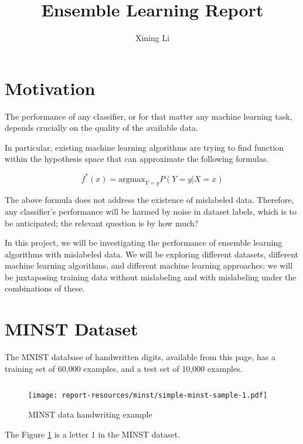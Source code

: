 \documentclass{article}
\author{Xining Li}
\title {Ensemble Learning Report}
\begin{document}
\maketitle

\section{Motivation}

The performance of any classifier, or for that matter any machine learning task, depends crucially on the quality of the available data. 


In particular, existing machine learning algorithms are trying to find function within the hypothesis space that can approximate the following formulas. 

\begin{equation}
    f^*(x) = {\mathrm {argmax}}_{Y=y} P (Y=y|X=x)
\end{equation}

The above formula does not address the existence of mislabeled data. Therefore, any classifier's performance will be harmed by noise in dataset labels, which is to be anticipated; the relevant question is by how much? 

In this project, we will be investigating the performance of ensemble learning algorithms with mislabeled data. We will be exploring different datasets, different machine learning algorithms, and different machine learning approaches; we will be juxtaposing training data without mislabeling and with mislabeling under the combinations of these. 

\section{MINST Dataset}

The MNIST database of handwritten digits, available from this page, has a training set of 60,000 examples, and a test set of 10,000 examples. 

\inputminted[firstline=16,lastline=20,frame=single,framesep=10pt]{python}{minst/main.py}

\begin{figure}[h!]
    \centering
    \texttt{[image: report-resources/minst/simple-minst-sample-1.pdf]}
    \caption{MINST data handwriting example}
    \label{fig:let1}
\end{figure}

The Figure \ref{fig:let1} is a letter 1 in the MINST dataset. 
\end{document}
